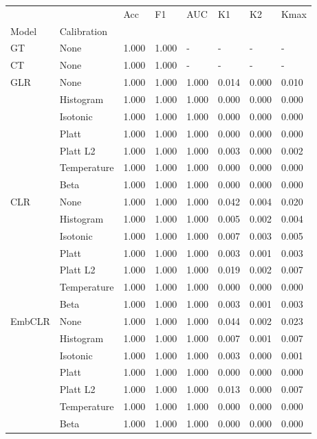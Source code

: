 \begin{tabular}{llllllll}
\toprule
 &  & Acc & F1 & AUC & K1 & K2 & Kmax \\
Model & Calibration &  &  &  &  &  &  \\
\midrule
GT & None & 1.000 & 1.000 & - & - & - & - \\
\cline{1-8}
CT & None & 1.000 & 1.000 & - & - & - & - \\
\cline{1-8}
\multirow[t]{7}{*}{GLR} & None & 1.000 & 1.000 & 1.000 & 0.014 & 0.000 & 0.010 \\
 & Histogram & 1.000 & 1.000 & 1.000 & 0.000 & 0.000 & 0.000 \\
 & Isotonic & 1.000 & 1.000 & 1.000 & 0.000 & 0.000 & 0.000 \\
 & Platt & 1.000 & 1.000 & 1.000 & 0.000 & 0.000 & 0.000 \\
 & Platt L2 & 1.000 & 1.000 & 1.000 & 0.003 & 0.000 & 0.002 \\
 & Temperature & 1.000 & 1.000 & 1.000 & 0.000 & 0.000 & 0.000 \\
 & Beta & 1.000 & 1.000 & 1.000 & 0.000 & 0.000 & 0.000 \\
\cline{1-8}
\multirow[t]{7}{*}{CLR} & None & 1.000 & 1.000 & 1.000 & 0.042 & 0.004 & 0.020 \\
 & Histogram & 1.000 & 1.000 & 1.000 & 0.005 & 0.002 & 0.004 \\
 & Isotonic & 1.000 & 1.000 & 1.000 & 0.007 & 0.003 & 0.005 \\
 & Platt & 1.000 & 1.000 & 1.000 & 0.003 & 0.001 & 0.003 \\
 & Platt L2 & 1.000 & 1.000 & 1.000 & 0.019 & 0.002 & 0.007 \\
 & Temperature & 1.000 & 1.000 & 1.000 & 0.000 & 0.000 & 0.000 \\
 & Beta & 1.000 & 1.000 & 1.000 & 0.003 & 0.001 & 0.003 \\
\cline{1-8}
\multirow[t]{7}{*}{EmbCLR} & None & 1.000 & 1.000 & 1.000 & 0.044 & 0.002 & 0.023 \\
 & Histogram & 1.000 & 1.000 & 1.000 & 0.007 & 0.001 & 0.007 \\
 & Isotonic & 1.000 & 1.000 & 1.000 & 0.003 & 0.000 & 0.001 \\
 & Platt & 1.000 & 1.000 & 1.000 & 0.000 & 0.000 & 0.000 \\
 & Platt L2 & 1.000 & 1.000 & 1.000 & 0.013 & 0.000 & 0.007 \\
 & Temperature & 1.000 & 1.000 & 1.000 & 0.000 & 0.000 & 0.000 \\
 & Beta & 1.000 & 1.000 & 1.000 & 0.000 & 0.000 & 0.000 \\
\cline{1-8}
\bottomrule
\end{tabular}
